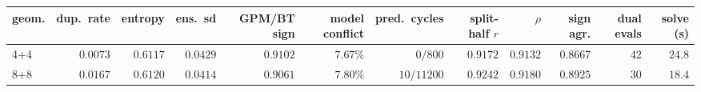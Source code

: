\begin{tabular}{lrrrrrrrrrrr}
\toprule
geom. & dup.\ rate & entropy & ens.\ sd & GPM/BT sign & model conflict & pred.\ cycles & split-half $r$ & $\rho$ & sign agr. & dual evals & solve (s)\\
\midrule
4+4 & $0.0073$ & $0.6117$ & $0.0429$ & $0.9102$ & $7.67\%$ & $0/800$ & $0.9172$ & $0.9132$ & $0.8667$ & $42$ & $24.8$\\
8+8 & $0.0167$ & $0.6120$ & $0.0414$ & $0.9061$ & $7.80\%$ & $10/11200$ & $0.9242$ & $0.9180$ & $0.8925$ & $30$ & $18.4$\\
\bottomrule
\end{tabular}

